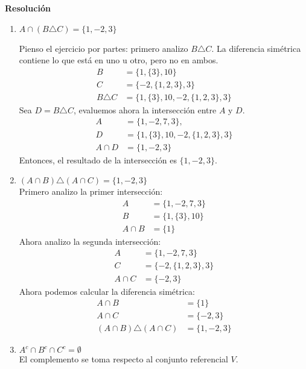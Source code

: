 \documentclass{article}
\begin{document}
\textbf{Resolución}
\begin{enumerate}[label=\roman*)]
    \item $A \cap (B \triangle C) = \{1, -2, 3\}$
    
    Pienso el ejercicio por partes: primero analizo $B \triangle C$. La diferencia simétrica contiene lo que está en uno u otro, pero no en ambos.
    \begin{align*}
        B &= \{1,\{3\}, 10 \} \\
        C &= \{-2,\{1,2,3\},3\} \\
        B \triangle C &= \{1, \{3\}, 10, -2, \{1,2,3\}, 3\}
    \end{align*}
    Sea $D = B \triangle C$, evaluemos ahora la intersección entre $A$ y $D$.
    \begin{align*}
        A &= \{1,-2,7,3\}, \\
        D &= \{1, \{3\}, 10, -2, \{1,2,3\}, 3\}\\
        A \cap D &= \{1, -2, 3\}
    \end{align*}
    Entonces, el resultado de la intersección es $\{1, -2, 3\}$.
    
    \item $(A \cap B) \triangle (A \cap C) =  \{1, -2, 3\} $ \\[6pt]
    Primero analizo la primer intersección:
    \begin{align*}
        A &= \{1,-2,7,3\}\\
        B &= \{1, \{3\}, 10\}\\
        A \cap B &= \{1\}
    \end{align*}
    Ahora analizo la segunda intersección:
    \begin{align*}
        A &= \{1, -2, 7, 3\}\\
        C &= \{-2, \{1,2,3\}, 3\}\\
        A \cap C &= \{-2, 3\}
    \end{align*}
    Ahora podemos calcular la diferencia simétrica:
    \begin{align*}
        A \cap B &= \{1\} \\
        A \cap C &= \{-2, 3\} \\
        (A \cap B) \triangle (A \cap C) &= \{1, -2, 3\}
    \end{align*}
    
    \item $A^{c} \cap B^{c} \cap C^{c} = \emptyset$ \\[6pt]
    El complemento se toma respecto al conjunto referencial $V$. 
    

\end{enumerate}
\end{document}
